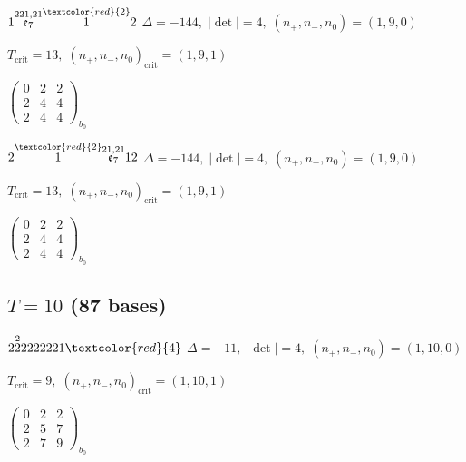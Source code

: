 \documentclass[10pt]{article}
\begin{document}
\smallskip

$1\overset{221,21}{\mathfrak{e}_7}\overset{\textcolor{red}{2}}{1}2$ \quad $\Delta=-144,\; |\det|=4,\; (n_+,n_-,n_0)=(1,9,0)$

\hspace{1em}$T_{\text{crit}}=13,\; (n_+,n_-,n_0)_{\text{crit}}=(1,9,1)$

\hspace{2em}$\left(\begin{smallmatrix}0 & 2 & 2 \\ 2 & 4 & 4 \\ 2 & 4 & 4\end{smallmatrix}\right)_{\!b_0}$

\smallskip

$2\overset{\textcolor{red}{2}}{1}\overset{21,21}{\mathfrak{e}_7}12$ \quad $\Delta=-144,\; |\det|=4,\; (n_+,n_-,n_0)=(1,9,0)$

\hspace{1em}$T_{\text{crit}}=13,\; (n_+,n_-,n_0)_{\text{crit}}=(1,9,1)$

\hspace{2em}$\left(\begin{smallmatrix}0 & 2 & 2 \\ 2 & 4 & 4 \\ 2 & 4 & 4\end{smallmatrix}\right)_{\!b_0}$


\subsection*{$T = 10$ \quad (87 bases)}
\smallskip

$2\overset{2}{2}2222221\textcolor{red}{4}$ \quad $\Delta=-11,\; |\det|=4,\; (n_+,n_-,n_0)=(1,10,0)$

\hspace{1em}$T_{\text{crit}}=9,\; (n_+,n_-,n_0)_{\text{crit}}=(1,10,1)$

\hspace{2em}$\left(\begin{smallmatrix}0 & 2 & 2 \\ 2 & 5 & 7 \\ 2 & 7 & 9\end{smallmatrix}\right)_{\!b_0}$

\smallskip
\end{document}

